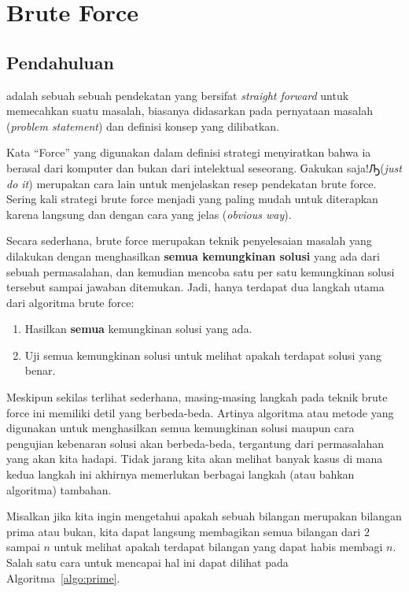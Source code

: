 \chapter{Brute Force}

\section{Pendahuluan}

 adalah sebuah sebuah pendekatan yang bersifat \textit{straight forward} untuk memecahkan suatu masalah, biasanya didasarkan pada pernyataan masalah (\textit{problem statement}) dan definisi konsep yang dilibatkan. 

Kata ``Force'' yang digunakan dalam definisi strategi menyiratkan bahwa ia berasal dari komputer dan bukan dari intelektual seseorang. Ԍakukan saja!Ԡ(\textit{just do it}) merupakan cara lain untuk menjelaskan resep pendekatan brute force. Sering kali strategi brute force menjadi yang paling mudah untuk diterapkan karena langsung dan dengan cara yang jelas (\textit{obvious way}).

Secara sederhana, brute force merupakan teknik penyelesaian masalah yang dilakukan dengan menghasilkan \textbf{semua kemungkinan solusi} yang ada dari sebuah permasalahan, dan kemudian mencoba satu per satu kemungkinan solusi tersebut sampai jawaban ditemukan. Jadi, hanya terdapat dua langkah utama dari algoritma brute force:

\begin{enumerate}
    \item Hasilkan \textbf{semua} kemungkinan solusi yang ada.
    \item Uji semua kemungkinan solusi untuk melihat apakah terdapat solusi yang benar.
\end{enumerate}

Meskipun sekilas terlihat sederhana, masing-masing langkah pada teknik brute force ini memiliki detil yang berbeda-beda. Artinya algoritma atau metode yang digunakan untuk menghasilkan semua kemungkinan solusi maupun cara pengujian kebenaran solusi akan berbeda-beda, tergantung dari permasalahan yang akan kita hadapi. Tidak jarang kita akan melihat banyak kasus di mana kedua langkah ini akhirnya memerlukan berbagai langkah (atau bahkan algoritma) tambahan.

Misalkan jika kita ingin mengetahui apakah sebuah bilangan merupakan bilangan prima atau bukan, kita dapat langsung membagikan semua bilangan dari $2$ sampai $n$ untuk melihat apakah terdapat bilangan yang dapat habis membagi $n$. Salah satu cara untuk mencapai hal ini dapat dilihat pada Algoritma~\ref{algo:prime}.

